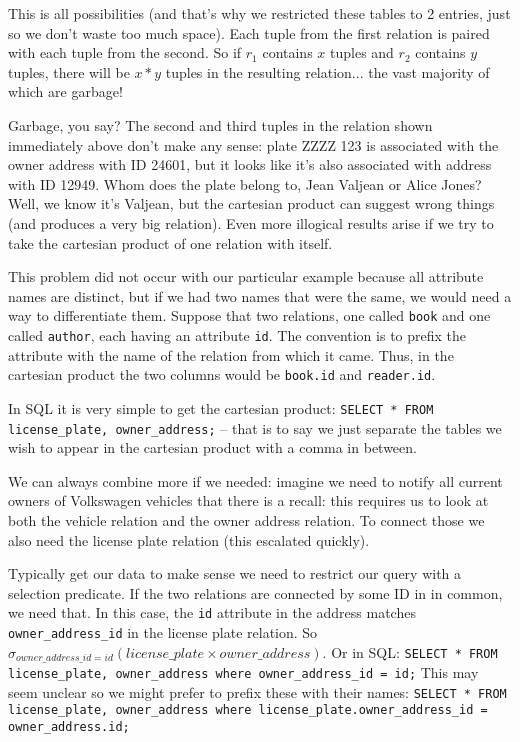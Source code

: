 This is all possibilities (and that's why we restricted these tables to 2 entries, just so we don't waste too much space). Each tuple from the first relation is paired with each tuple from the second. So if $r_{1}$ contains $x$ tuples and $r_{2}$ contains $y$ tuples, there will be $x*y$ tuples in the resulting relation... the vast majority of which are garbage! 

Garbage, you say? The second and third tuples in the relation shown immediately above don't make any sense: plate ZZZZ 123 is associated with the owner address with ID 24601, but it looks like it's also associated with address with ID 12949. Whom does the plate belong to, Jean Valjean or Alice Jones? Well, we know it's Valjean, but the cartesian product can suggest wrong things (and produces a very big relation). Even more illogical results arise if we try to take the cartesian product of one relation with itself.

This problem did not occur with our particular example because all attribute names are distinct, but if we had two names that were the same, we would need a way to differentiate them. Suppose that two relations, one called \texttt{book} and one called \texttt{author}, each having an attribute \texttt{id}. The convention is to prefix the attribute with the name of the relation from which it came. Thus, in the cartesian product the two columns would be \texttt{book.id} and \texttt{reader.id}.

In SQL it is very simple to get the cartesian product: \texttt{SELECT * FROM license\_plate, owner\_address;} -- that is to say we just separate the tables we wish to appear in the cartesian product with a comma in between.

We can always combine more if we needed: imagine we need to notify all current owners of Volkswagen vehicles that there is a recall: this requires us to look at both the vehicle relation and the owner address relation. To connect those we also need the license plate relation (this escalated quickly).

Typically get our data to make sense we need to restrict our query with a selection predicate. If the two relations are connected by some ID in in common, we need that. In this case, the \texttt{id} attribute in the address matches \texttt{owner\_address\_id} in the license plate relation. So $\sigma_{owner\_address\_id = id}( license\_plate \times owner\_address )$. Or in SQL: \texttt{SELECT * FROM license\_plate, owner\_address where owner\_address\_id = id;} This may seem unclear so we might prefer to prefix these with their names: \texttt{SELECT * FROM license\_plate, owner\_address where license\_plate.owner\_address\_id = owner\_address.id;} 

